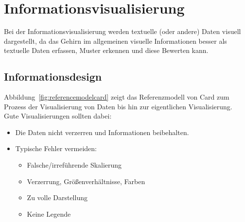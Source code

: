 \chapter{Informationsvisualisierung}
	Bei der Informationsvisualisierung werden textuelle (oder andere) Daten visuell dargestellt, da das Gehirn im allgemeinen visuelle Informationen besser als textuelle Daten erfassen, Muster erkennen und diese Bewerten kann.

	\section{Informationsdesign}
		Abbildung~\ref{fig:referencemodelcard} zeigt das Referenzmodell von Card zum Prozess der Visualisierung von Daten bis hin zur eigentlichen Visualisierung. Gute Visualisierungen sollten dabei:
		\begin{itemize}
			\item Die Daten nicht verzerren und Informationen beibehalten.
			\item Typische Fehler vermeiden:
				\begin{itemize}
					\item Falsche/irreführende Skalierung
					\item Verzerrung, Größenverhältnisse, Farben
					\item Zu volle Darstellung
					\item Keine Legende
				\end{itemize}
		\end{itemize}
	
